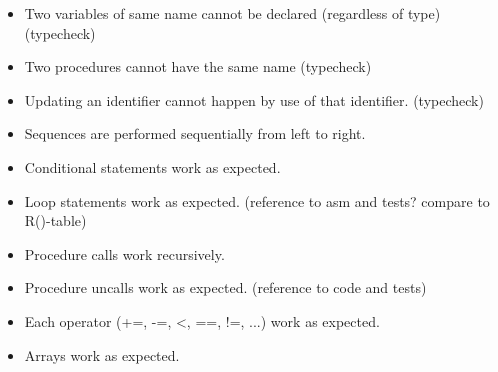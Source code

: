 \begin{itemize}
\item Two variables of same name cannot be declared (regardless of type) (typecheck)
\item Two procedures cannot have the same name (typecheck)
\item Updating an identifier cannot happen by use of that identifier. (typecheck)
\item Sequences are performed sequentially from left to right.
\item Conditional statements work as expected.
\item Loop statements work as expected. (reference to asm and tests? compare to R()-table)
\item Procedure calls work recursively.
\item Procedure uncalls work as expected. (reference to code and tests)
\item Each operator (+=, -=, <, ==, !=, ...) work as expected.
\item Arrays work as expected.
\end{itemize}
